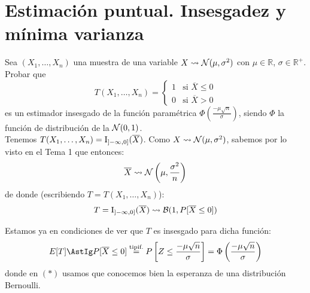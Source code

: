 \section{Estimación puntual. Insesgadez y mínima varianza}

\begin{ejercicio}
    Sea $(X_1, \ldots, X_n)$ una muestra de una variable $X\rightsquigarrow\mathcal{N}(\mu, \sigma^2)$ con $\mu\in \mathbb{R}$, $\sigma\in \mathbb{R}^+$. Probar que
    \begin{equation*}
        T(X_1, \ldots, X_n) = \left\{\begin{array}{ll}
            1 & \text{si\ } \overline{X}\leq 0 \\
            0 & \text{si\ } \overline{X} > 0
        \end{array}\right. 
    \end{equation*}
    es un estimador insesgado de la función paramétrica $\Phi\left(\frac{-\mu \sqrt{n}}{\sigma}\right)$, siendo $\Phi$ la función de distribución de la $\mathcal{N}(0,1)$.\\

    \noindent
    Tenemos $T(X_1, \ldots, X_n) = \operatorname{I}_{\left]-\infty,0\right]}(\overline{X})$. Como $X\rightsquigarrow \mathcal{N}(\mu, \sigma^2)$, sabemos por lo visto en el Tema 1 que entonces:
    \begin{equation*}
        \overline{X} \rightsquigarrow \mathcal{N}\left(\mu, \frac{\sigma^2}{n}\right)
    \end{equation*}
    de donde (escribiendo $T=T(X_1,\ldots,X_n)$):
    \begin{equation*}
    T = \operatorname{I}_{\left]-\infty,0\right]}(\overline{X}) \rightsquigarrow \mathcal{B}(1,P[\overline{X}\leq 0])
    \end{equation*}

    Estamos ya en condiciones de ver que $T$ es insesgado para dicha función:
    \begin{equation*}
        E[T] \AstIg P[\overline{X}\leq 0] \stackrel{\text{tipif.}}{=} P\left[Z \leq \dfrac{-\mu\sqrt{n}}{\sigma}\right] = \Phi\left(\dfrac{-\mu\sqrt{n}}{\sigma}\right) 
    \end{equation*}
    donde en $(\ast)$ usamos que conocemos bien la esperanza de una distribución Bernoulli.
\end{ejercicio}

